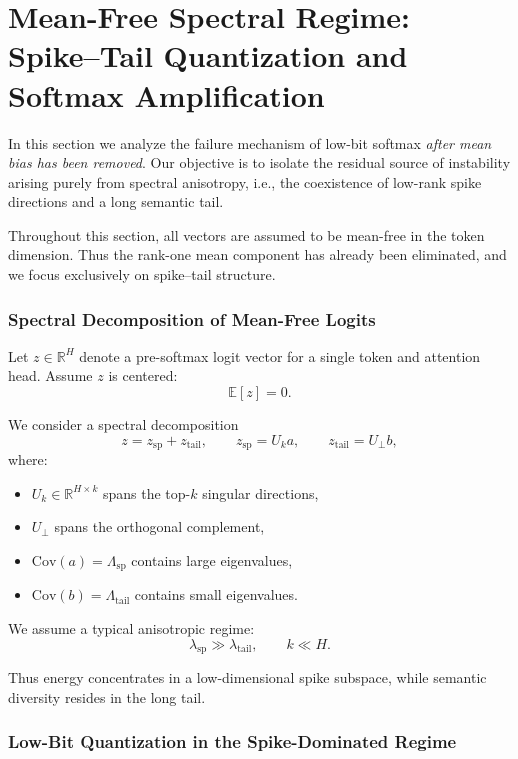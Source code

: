 \chapter{Mean-Free Spectral Regime: Spike--Tail Quantization and Softmax Amplification}
\label{sec:meanfree_spectral_softmax}

In this section we analyze the failure mechanism of low-bit softmax
\emph{after mean bias has been removed}.
Our objective is to isolate the residual source of instability
arising purely from spectral anisotropy,
i.e., the coexistence of low-rank spike directions and a long semantic tail.

Throughout this section, all vectors are assumed to be mean-free in the token dimension.
Thus the rank-one mean component has already been eliminated,
and we focus exclusively on spike--tail structure.

\subsection{Spectral Decomposition of Mean-Free Logits}

Let $z \in \mathbb{R}^H$ denote a pre-softmax logit vector
for a single token and attention head.
Assume $z$ is centered:
\[
\mathbb{E}[z] = 0.
\]

We consider a spectral decomposition
\begin{equation}
z = z_{\mathrm{sp}} + z_{\mathrm{tail}},
\qquad
z_{\mathrm{sp}} = U_k a,
\qquad
z_{\mathrm{tail}} = U_\perp b,
\label{eq:spike_tail_decomp}
\end{equation}
where:

\begin{itemize}
\item $U_k \in \mathbb{R}^{H \times k}$ spans the top-$k$ singular directions,
\item $U_\perp$ spans the orthogonal complement,
\item $\mathrm{Cov}(a) = \Lambda_{\mathrm{sp}}$ contains large eigenvalues,
\item $\mathrm{Cov}(b) = \Lambda_{\mathrm{tail}}$ contains small eigenvalues.
\end{itemize}

We assume a typical anisotropic regime:
\[
\lambda_{\mathrm{sp}} \gg \lambda_{\mathrm{tail}},
\qquad
k \ll H.
\]

Thus energy concentrates in a low-dimensional spike subspace,
while semantic diversity resides in the long tail.

\subsection{Low-Bit Quantization in the Spike-Dominated Regime}

